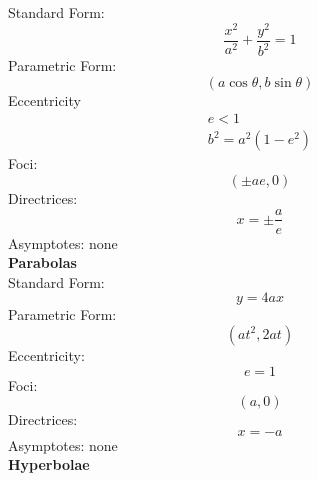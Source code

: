 \documentclass{book}
\begin{document}
            Standard Form:
            \begin{equation}
                \frac{x^2}{a^2}+\frac{y^2}{b^2}=1
            \end{equation}
            Parametric Form:
            \begin{equation}
                (a\cos\theta,b\sin\theta)
            \end{equation}
            Eccentricity
            \begin{equation}
                \begin{gathered}
                    e<1 \\ b^2=a^2(1-e^2)
                \end{gathered}
            \end{equation}
            Foci:
            \begin{equation}
                (\pm ae,0)
            \end{equation}
            Directrices:
            \begin{equation}
                x=\pm\frac{a}{e}
            \end{equation}
            Asymptotes: none \\

            \noindent\textbf{Parabolas} \\

            Standard Form:
            \begin{equation}
                y=4ax
            \end{equation}
            Parametric Form:
            \begin{equation}
                (at^2,2at)
            \end{equation}
            Eccentricity:
            \begin{equation}
                e=1
            \end{equation}
            Foci:
            \begin{equation}
                (a,0)
            \end{equation}
            Directrices:
            \begin{equation}
                x=-a
            \end{equation}
            Asymptotes: none \\

            \noindent\textbf{Hyperbolae} \\
\end{document}
